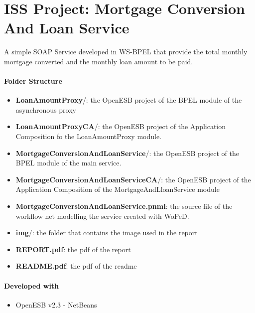 \documentclass[
10pt, %
a4paper, %
oneside, %
headinclude,footinclude, %
BCOR5mm, %
]{scrartcl}
\begin{document}
\section*{ISS Project: Mortgage Conversion And Loan Service}
A simple SOAP Service developed in WS-BPEL that provide the total monthly mortgage 
converted and the monthly loan amount to be paid.

\paragraph{Folder Structure}
\begin{itemize}
\item \textbf{LoanAmountProxy}/: the OpenESB project of the BPEL module of the asynchronous proxy
\item \textbf{LoanAmountProxyCA}/: the OpenESB project of the Application Composition fo the LoanAmountProxy module.
\item \textbf{MortgageConversionAndLoanService}/: the OpenESB project of the BPEL module of the main service.
\item \textbf{MortgageConversionAndLoanServiceCA}/: the OpenESB project of the Application Composition of the MortgageAndLloanService module
\item \textbf{MortgageConversionAndLoanService.pnml}: the source file of the workflow net modelling the service created with WoPeD.
\item \textbf{img}/: the folder that contains the image used in the report
\item \textbf{REPORT.pdf}: the pdf of the report
\item \textbf{README.pdf}: the pdf of the readme
\end{itemize}
\paragraph{Developed with}
\begin{itemize}
\item OpenESB v2.3 - NetBeans
\end{itemize}
\end{document}
